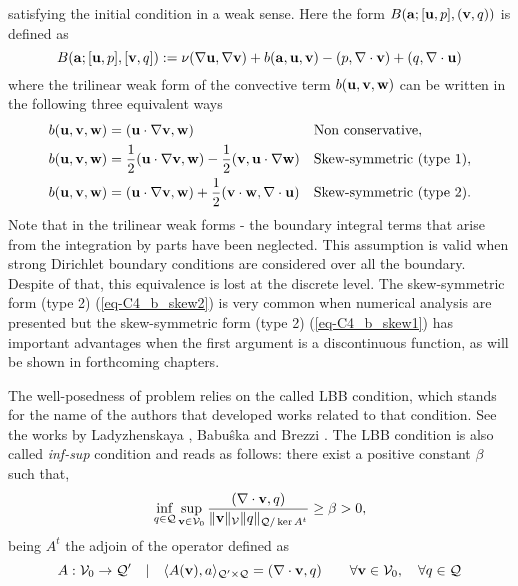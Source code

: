 satisfying the initial condition  in a weak sense. Here the form $B({{\bf a}};[{\bf u},p],({\bf v},q))$ is defined as 
\begin{equation}
\label{eq-C2_bilinear}
B({\bf a};[{\bf u},p],[{\bf v},q]):=\nu(\nabla{\bf u},\nabla{\bf v})+b({\bf a},{\bf u},{\bf v})-(p,\nabla\cdot{\bf v})+(q,\nabla\cdot{\bf u})
\end{equation}
where the trilinear weak form of the convective term $b({\bf u},{\bf v},{\bf w})$ can be written in the following three equivalent ways
\begin{align}
\label{eq-C2_b_noskew}
&b({\bf u},{\bf v},{\bf w})=({\bf u}\cdot\nabla{\bf v},{\bf w})&&\mbox{Non conservative},\\
\label{eq-C2_b_skew1}
&b({\bf u},{\bf v},\mathbf{w})=\frac{1}{2}({\bf u}\cdot\nabla{\bf v},\mathbf{w})-\frac{1}{2}({\bf v},{\bf u}\cdot\nabla\mathbf{w})&&\mbox{Skew-symmetric (type 1)},\\
\label{eq-C2_b_skew2}
&b({\bf u},{\bf v},\mathbf{w})=({\bf u}\cdot\nabla{\bf v},\mathbf{w})+\frac{1}{2}({\bf v}\cdot\mathbf{w},\nabla\cdot{\bf u})&&\mbox{Skew-symmetric (type 2)}.
\end{align}
Note that in the trilinear weak forms - the boundary integral terms that arise from the integration by parts have been neglected. This assumption is valid when strong Dirichlet boundary conditions are considered over all the boundary. Despite of that, this equivalence is lost at the discrete level. The skew-symmetric form (type 2) (\ref{eq-C4_b_skew2}) is very common when numerical analysis are presented \cite{badia_convergence_2014,burman_galerkin_2009,guermond_faedogalerkin_2007} but the skew-symmetric form (type 2) (\ref{eq-C4_b_skew1}) has important advantages when the first argument is a discontinuous function, as will be shown in forthcoming chapters.

The well-posedness of problem  relies on the called LBB condition, which stands for the name of the authors that developed works related to that condition. See the works by Ladyzhenskaya \cite{ladyzhenskaya1969mathematical}, Babu\^{s}ka \cite{babuska_error-bounds_1971} and Brezzi \cite{brezzi1974existence}. The LBB condition is also called \textit{inf-sup} condition and reads as follows: there exist a positive constant $ \beta $ such that,
\begin{equation}
\label{eq-C2_lbb}
\inf_{q\in\mathcal{Q}}\sup_{{\bf v}\in\mathcal{V}_0}\frac{(\nabla\cdot{\bf v},q)}{\|{\bf v}\|_\mathcal{V}\|q\|_{\mathcal{Q}/\ker A^t}}\ge\beta>0,
\end{equation}
being $ A^t $ the adjoin of the operator defined as 
\begin{equation}
\label{eq-C2_lbb_operator}
A: \mathcal{V}_0\rightarrow\mathcal{Q'} \quad| \quad\langle A({\bf v}),a\rangle_{\mathcal{Q'}\times\mathcal{Q}}=(\nabla\cdot{\bf v},q)\quad\quad\forall{\bf v}\in\mathcal{V}_0,\quad\forall q\in\mathcal{Q}
\end{equation}

